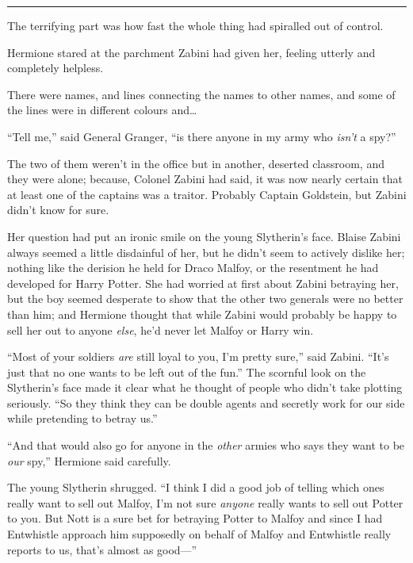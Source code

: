 \begin{center}\rule{3in}{0.4pt}\end{center}

The terrifying part was how fast the whole thing had spiralled out of
control.

Hermione stared at the parchment Zabini had given her, feeling utterly
and completely helpless.

There were names, and lines connecting the names to other names, and
some of the lines were in different colours and\ldots{}

``Tell me,'' said General Granger, ``is there anyone in my army who
\emph{isn't} a spy?''

The two of them weren't in the office but in another, deserted
classroom, and they were alone; because, Colonel Zabini had said, it was
now nearly certain that at least one of the captains was a traitor.
Probably Captain Goldstein, but Zabini didn't know for sure.

Her question had put an ironic smile on the young Slytherin's face.
Blaise Zabini always seemed a little disdainful of her, but he didn't
seem to actively dislike her; nothing like the derision he held for
Draco Malfoy, or the resentment he had developed for Harry Potter. She
had worried at first about Zabini betraying her, but the boy seemed
desperate to show that the other two generals were no better than him;
and Hermione thought that while Zabini would probably be happy to sell
her out to anyone \emph{else}, he'd never let Malfoy or Harry win.

``Most of your soldiers \emph{are} still loyal to you, I'm pretty
sure,'' said Zabini. ``It's just that no one wants to be left out of the
fun.'' The scornful look on the Slytherin's face made it clear what he
thought of people who didn't take plotting seriously. ``So they think
they can be double agents and secretly work for our side while
pretending to betray us.''

``And that would also go for anyone in the \emph{other} armies who says
they want to be \emph{our} spy,'' Hermione said carefully.

The young Slytherin shrugged. ``I think I did a good job of telling
which ones really want to sell out Malfoy, I'm not sure \emph{anyone}
really wants to sell out Potter to you. But Nott is a sure bet for
betraying Potter to Malfoy and since I had Entwhistle approach him
supposedly on behalf of Malfoy and Entwhistle really reports to us,
that's almost as good---''


